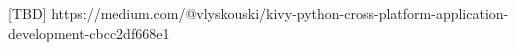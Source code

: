 
[TBD] https://medium.com/@vlyskouski/kivy-python-cross-platform-application-development-cbcc2df668e1
